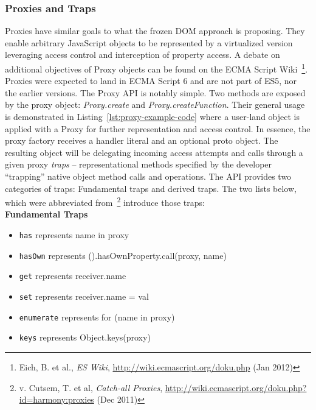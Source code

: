       \subsubsection{Proxies and Traps}
      \label{subsubsec:6.4.1.proxies_and_traps}

      Proxies have similar goals to what the frozen DOM approach is proposing. They enable arbitrary JavaScript objects to be represented by a virtualized version leveraging access control and interception of property access. A debate on additional objectives of Proxy objects can be found on the ECMA Script Wiki~\footnote{Eich, B. et al., \textit{ES Wiki}, \url{http://wiki.ecmascript.org/doku.php} (Jan 2012)}. Proxies were expected to land in ECMA Script 6 and are not part of ES5, nor the earlier versions. The Proxy API is notably simple. Two methods are exposed by the proxy object: \textit{Proxy.create} and \textit{Proxy.createFunction}. Their general usage is demonstrated in Listing~\ref{lst:proxy-example-code} where a user-land object is applied with a Proxy for further representation and access control. In essence, the proxy factory receives a handler literal and an optional proto object. The resulting object will be delegating incoming access attempts and calls through a given proxy \textit{traps} -- representational methods specified by the developer ``trapping'' native object method calls and operations. The API provides two categories of traps: Fundamental traps and derived traps. The two lists below, which were abbreviated from~\footnote{v. Cutsem, T. et al, \textit{Catch-all Proxies}, \url{http://wiki.ecmascript.org/doku.php?id=harmony:proxies} (Dec 2011)} introduce those traps:\\

\textbf{Fundamental Traps}
\begin{itemize}
  \item \texttt{has} represents name in proxy
  \item \texttt{hasOwn} represents ({}).hasOwnProperty.call(proxy, name)
  \item \texttt{get} represents receiver.name
  \item \texttt{set} represents receiver.name = val
  \item \texttt{enumerate} represents for (name in proxy)
  \item \texttt{keys} represents Object.keys(proxy)
\end{itemize}

